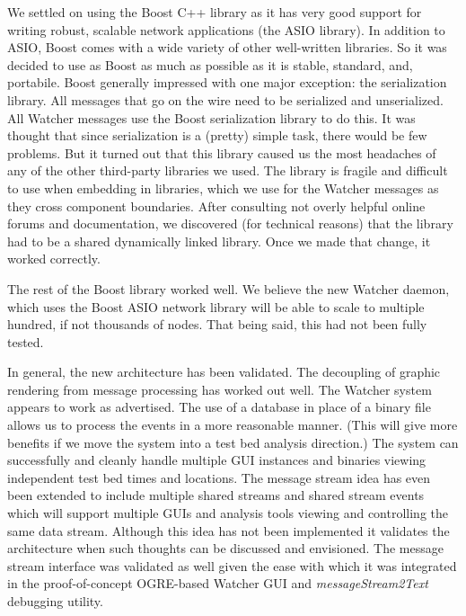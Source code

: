 \documentclass{report}
\begin{document}
We settled on using the Boost C++ library as it has very good support for writing robust, scalable network applications (the ASIO library). In addition
to ASIO, Boost comes with a wide variety of other well-written libraries. So it was decided to use as Boost as much as possible as it is stable, standard, and, portabile. 
Boost generally impressed with one major exception: the serialization library. All messages that go on the wire need to be serialized and unserialized. All Watcher 
messages use the Boost serialization library to do
this. It was thought that since serialization is a (pretty) simple task, there would be few problems. But it turned out that this library caused us the most headaches 
of any of the other third-party libraries we used. The library is fragile and difficult to use when embedding in libraries, which we use for the Watcher messages as they 
cross component boundaries. After consulting not overly helpful online forums and documentation, we discovered (for technical reasons) that the library had to be a shared 
dynamically linked library. Once we made that change, it worked correctly. 

The rest of the Boost library worked well. We believe the new Watcher daemon, which uses the Boost ASIO network library will be able to scale
to multiple hundred, if not thousands of nodes. That being said, this had not been fully tested. 

In general, the new architecture has been validated. The decoupling of graphic rendering from message processing has worked out well. The Watcher system
appears to work as advertised. The use of a database in place of a binary file allows us to process the events in a more reasonable manner. (This will give
more benefits if we move the system into a test bed analysis direction.) The system can successfully and cleanly handle multiple GUI instances and binaries 
viewing independent test bed times and locations. The message stream idea has even been extended to include multiple shared streams and shared stream events
which will support multiple GUIs and analysis tools viewing and controlling the same data stream. Although this idea has not been implemented it validates
the architecture when such thoughts can be discussed and envisioned. The message stream interface was validated as well given the ease with which it 
was integrated in the proof-of-concept OGRE-based Watcher GUI and {\it messageStream2Text} debugging utility. 
\end{document}
